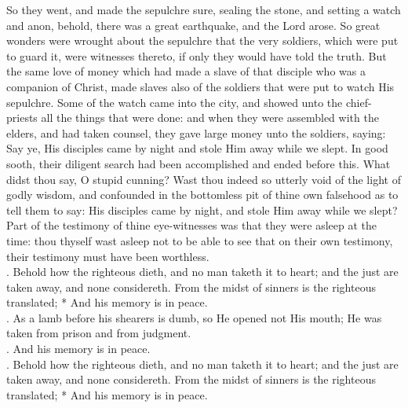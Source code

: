 \begin{Parallel}[v]{\colw}{\colx}
{{So they went, and made the sepulchre sure, sealing the stone, and setting a watch and anon, behold, there was a great earthquake, and the Lord arose. So great wonders were wrought about the sepulchre that the very soldiers, which were put to guard it, were witnesses thereto, if only they would have told the truth. But the same love of money which had made a slave of that disciple who was a companion of Christ, made slaves also of the soldiers that were put to watch His sepulchre. Some of the watch came into the city, and showed unto the chief-priests all the things that were done: and when they were assembled with the elders, and had taken counsel, they gave large money unto the soldiers, saying: Say ye, His disciples came by night and stole Him away while we slept. In good sooth, their diligent search had been accomplished and ended before this. What didst thou say, O stupid cunning? Wast thou indeed so utterly void of the light of godly wisdom, and confounded in the bottomless pit of thine own falsehood as to tell them to say: His disciples came by night, and stole Him away while we slept? Part of the testimony of thine eye-witnesses was that they were asleep at the time: thou thyself wast asleep not to be able to see that on their own testimony, their testimony must have been worthless.
\\
\Rbar. Behold how the righteous dieth, and no man taketh it to heart; and the just are taken away, and none considereth. From the midst of sinners is the righteous translated;
* And his memory is in peace.\\
\Vbar. As a lamb before his shearers is dumb, so He opened not His mouth; He was taken from prison and from judgment.\\
\Rbar. And his memory is in peace.\\
\Rbar. Behold how the righteous dieth, and no man taketh it to heart; and the just are taken away, and none considereth. From the midst of sinners is the righteous translated; * And his memory is in peace.}}

\end{Parallel}
